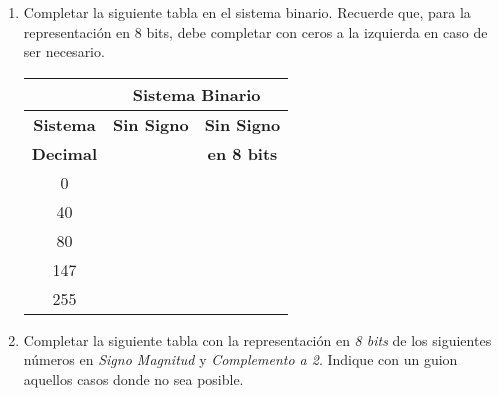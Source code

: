 \documentclass[12pt]{article}
\begin{document}
\begin{enumerate}

    \item Completar la siguiente tabla en el sistema binario. Recuerde que,
        para la representación en 8 bits, debe completar con ceros a la
        izquierda en caso de ser necesario.

    \begin{center}

        \begin{tabular}[t]{|c|c|c|}

        \cline{2-3}

            \multicolumn{1}{c}{}&\multicolumn{2}{|c|}{\textbf{Sistema Binario}}\\

        \hline

            \textbf{Sistema} & \textbf{Sin Signo}& \textbf{Sin Signo}\\

            \textbf{Decimal} & ~ & \textbf{en 8 bits}\\

        \hline

            0 & \hspace{14em}~&\hspace{14em}~\\

        \hline

            40&&\\

        \hline

            80&&\\

        \hline

            147&&\\

        \hline

            255&&\\

        \hline

        \end{tabular}

    \end{center}

\item Completar la siguiente tabla con la representación en \emph{8 bits} de
    los siguientes números en \emph{Signo Magnitud} y \emph{Complemento a 2}.
    Indique con un guion aquellos casos donde no sea posible.


\end{enumerate}
\end{document}

